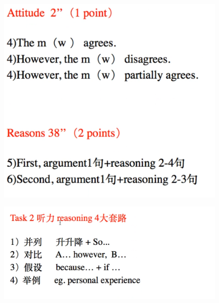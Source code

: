 \documentclass{ctexart}
\begin{document}
  \begin{figure}[htp]
    \centering
    \includegraphics[width=.8\linewidth]{image3.png}
    \caption{}
  \end{figure}
  \begin{figure}[htp]
    \centering
    \includegraphics[width=.8\linewidth]{image4.png}
    \caption{}
  \end{figure}
\end{document}
